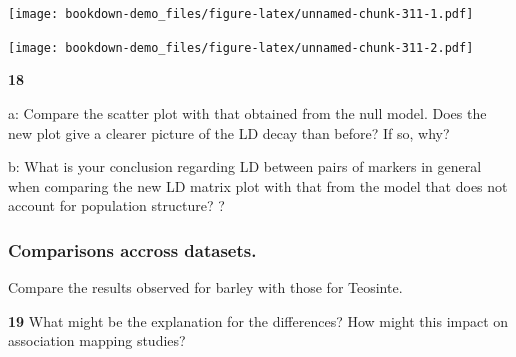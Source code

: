 \documentclass[
]{book}
\makeatletter
\newenvironment{Shaded}{\begin{snugshade}}{\end{snugshade}}
\newcommand{\AttributeTok}[1]{\textcolor[rgb]{0.77,0.63,0.00}{#1}}
\newcommand{\DecValTok}[1]{\textcolor[rgb]{0.00,0.00,0.81}{#1}}
\newcommand{\FloatTok}[1]{\textcolor[rgb]{0.00,0.00,0.81}{#1}}
\newcommand{\FunctionTok}[1]{\textcolor[rgb]{0.00,0.00,0.00}{#1}}
\newcommand{\NormalTok}[1]{#1}
\newcommand{\OtherTok}[1]{\textcolor[rgb]{0.56,0.35,0.01}{#1}}
\newcommand{\SpecialCharTok}[1]{\textcolor[rgb]{0.00,0.00,0.00}{#1}}
\newcommand{\StringTok}[1]{\textcolor[rgb]{0.31,0.60,0.02}{#1}}
\newenvironment{kframe}{%
\medskip{}
\setlength{\fboxsep}{.8em}
 \def\at@end@of@kframe{}%
 \ifinner\ifhmode%
  \def\at@end@of@kframe{\end{minipage}}%
  \begin{minipage}{\columnwidth}%
 \fi\fi%
 \def\FrameCommand##1{\hskip\@totalleftmargin \hskip-\fboxsep
 \colorbox{shadecolor}{##1}\hskip-\fboxsep
     \hskip-\linewidth \hskip-\@totalleftmargin \hskip\columnwidth}%
 \MakeFramed {\advance\hsize-\width
   \@totalleftmargin\z@ \linewidth\hsize
   \@setminipage}}%
 {\par\unskip\endMakeFramed%
 \at@end@of@kframe}
\newenvironment{rmdblock}[1]
  {
  \begin{itemize}
  \renewcommand{\labelitemi}{
    \raisebox{-.7\height}[0pt][0pt]{
      {\setkeys{Gin}{width=3em,keepaspectratio}\texttt{[image: images/\#1]}}
    }
  }
  \setlength{\fboxsep}{1em}
  \begin{kframe}
  \item
  }
  {
  \end{kframe}
  \end{itemize}
  }
\newenvironment{rmdquiz}
  {\begin{rmdblock}{quiz}}
  {\end{rmdblock}}
\makeatother
\begin{document}
\texttt{[image: bookdown-demo\_files/figure-latex/unnamed-chunk-311-1.pdf]}

\begin{Shaded}
\end{Shaded}

\texttt{[image: bookdown-demo\_files/figure-latex/unnamed-chunk-311-2.pdf]}

\begin{rmdquiz}
\textbf{18}

a: Compare the scatter plot with that obtained from the null model. Does the new plot give a clearer picture of the LD decay than before? If so, why?

b: What is your conclusion regarding LD between pairs of markers in general when comparing the new LD matrix plot with that from the model that does not account for population structure? ?
\end{rmdquiz}

\hypertarget{comparisons-accross-datasets.}{%
\subsubsection{Comparisons accross datasets.}\label{comparisons-accross-datasets.}}

Compare the results observed for barley with those for Teosinte.

\begin{rmdquiz}
\textbf{19}
What might be the explanation for the differences? How might this impact on association mapping studies?
\end{rmdquiz}
\end{document}
